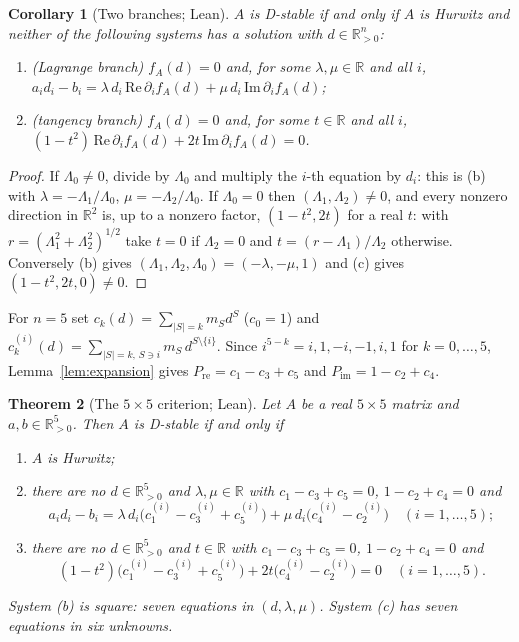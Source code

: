 \documentclass[11pt,a4paper]{article}
\theoremstyle{plain}
\newtheorem{theorem}{Theorem}[section]
\newtheorem{corollary}[theorem]{Corollary}
\theoremstyle{definition}
\newcommand{\R}{\mathbb{R}}
\newcommand{\Rp}{\R^n_{>0}}
\newcommand{\Pre}{P_{\mathrm{re}}}
\newcommand{\Pim}{P_{\mathrm{im}}}
\begin{document}
\begin{corollary}[Two branches; Lean]\label{cor:branches}
$A$ is D-stable if and only if $A$ is Hurwitz and neither of the following systems has a solution with
$d\in\Rp$:
\begin{enumerate}[label=(\alph*),start=2]
\item (Lagrange branch) $f_A(d)=0$ and, for some $\lambda,\mu\in\R$ and all $i$,
$a_id_i-b_i=\lambda\,d_i\,\mathrm{Re}\,\partial_if_A(d)+\mu\,d_i\,\mathrm{Im}\,\partial_if_A(d)$;
\item (tangency branch) $f_A(d)=0$ and, for some $t\in\R$ and all $i$,
$(1-t^2)\,\mathrm{Re}\,\partial_if_A(d)+2t\,\mathrm{Im}\,\partial_if_A(d)=0$.
\end{enumerate}
\end{corollary}

\begin{proof}
If $\Lambda_0\neq0$, divide by $\Lambda_0$ and multiply the $i$-th equation by $d_i$: this is (b) with
$\lambda=-\Lambda_1/\Lambda_0$, $\mu=-\Lambda_2/\Lambda_0$. If $\Lambda_0=0$ then $(\Lambda_1,\Lambda_2)\neq0$, and
every nonzero direction in $\R^2$ is, up to a nonzero factor, $(1-t^2,2t)$ for a real $t$: with
$r=(\Lambda_1^2+\Lambda_2^2)^{1/2}$ take $t=0$ if $\Lambda_2=0$ and $t=(r-\Lambda_1)/\Lambda_2$ otherwise.
Conversely (b) gives $(\Lambda_1,\Lambda_2,\Lambda_0)=(-\lambda,-\mu,1)$ and (c) gives $(1-t^2,2t,0)\neq0$.
\end{proof}

For $n=5$ set $c_k(d)=\sum_{|S|=k}m_Sd^S$ ($c_0=1$) and
$c_k^{(i)}(d)=\sum_{|S|=k,\,S\ni i}m_S\,d^{S\setminus\{i\}}$. Since $i^{5-k}=i,1,-i,-1,i,1$ for $k=0,\dots,5$,
Lemma~\ref{lem:expansion} gives $\Pre=c_1-c_3+c_5$ and $\Pim=1-c_2+c_4$.

\begin{theorem}[The $5\times5$ criterion; Lean]\label{thm:five}
Let $A$ be a real $5\times5$ matrix and $a,b\in\R^5_{>0}$. Then $A$ is D-stable if and only if
\begin{enumerate}[label=(\alph*)]
\item $A$ is Hurwitz;
\item there are no $d\in\R^5_{>0}$ and $\lambda,\mu\in\R$ with $c_1-c_3+c_5=0$, $1-c_2+c_4=0$ and
\[a_id_i-b_i=\lambda\,d_i\bigl(c^{(i)}_1-c^{(i)}_3+c^{(i)}_5\bigr)+\mu\,d_i\bigl(c^{(i)}_4-c^{(i)}_2\bigr)\quad(i=1,\dots,5);\]
\item there are no $d\in\R^5_{>0}$ and $t\in\R$ with $c_1-c_3+c_5=0$, $1-c_2+c_4=0$ and
\[(1-t^2)\bigl(c^{(i)}_1-c^{(i)}_3+c^{(i)}_5\bigr)+2t\bigl(c^{(i)}_4-c^{(i)}_2\bigr)=0\quad(i=1,\dots,5).\]
\end{enumerate}
System (b) is square: seven equations in $(d,\lambda,\mu)$. System (c) has seven equations in six unknowns.
\end{theorem}
\end{document}
